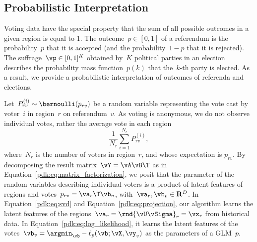 
\subsection{Probabilistic Interpretation}

Voting data have the special property that the sum of all possible outcomes in a given region is equal to 1.
The outcome~$p \in [0, 1]$ of a referendum is the probability~$p$ that it is accepted (and the probability~$1-p$ that it is rejected).
The suffrage~$\vp \in [0, 1]^K$ obtained by~$K$ political parties in an election describes the probability mass function~$p(k)$ that the~$k$-th party is elected.
As a result, we provide a probabilistic interpretation of outcomes of referenda and elections.

Let~$P_{rv}^{(i)} \sim \bernoulli(p_{rv})$ be a random variable representing the vote cast by voter~$i$ in region~$r$ on referendum~$v$.
As voting is anonymous, we do not observe individual votes, rather the average vote in each region
\begin{equation*}
	\frac{1}{N_r} \sum_{i=1}^{N_r} P_{rv}^{(i)},
\end{equation*}
where~$N_r$ is the number of voters in region~$r$, and whose expectation is $p_{rv}$.
By decomposing the result matrix~$\vY = \vA \vB\T$ as in Equation~\eqref{pdk:eq:matrix_factorization}, we posit that the parameter of the random variables describing individual voters is a product of latent features of regions and votes~$p_{rv} = \va_r\T \vb_v$, with~$\va_r, \vb_v \in \mathbf{R}^D$.
In Equation~\eqref{pdk:eq:svd} and Equation~\eqref{pdk:eq:projection}, our algorithm learns the latent features of the regions~$\va_r = \rnd{\vU \vSigma}_r = \vx_r$ from historical data.
In Equation~\eqref{pdk:eq:log_likelihood}, it learns the latent features of the votes~$\vb_v = \argmin_{\vb} -\ell_p(\vb ; \vX, \vy_v)$ as the parameters of a GLM~$p$.

